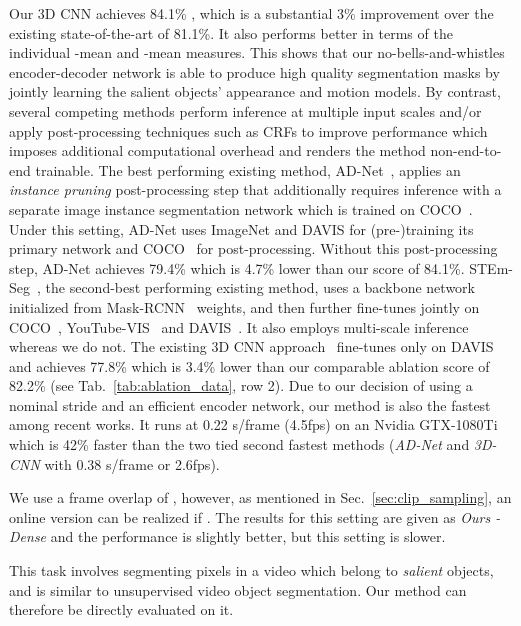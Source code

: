 \documentclass{bmvc2k}
\newcommand{\PAR}[1]{\vskip4pt \noindent {\bf #1~}}
\begin{document}
Our 3D CNN achieves 84.1\% , which is a substantial 3\% improvement over the existing state-of-the-art of 81.1\%. It also performs better in terms of the individual -mean and -mean measures.
This shows that our no-bells-and-whistles encoder-decoder network is able to produce high quality segmentation masks by jointly learning the salient objects' appearance and motion models. 
By contrast, several competing methods perform inference at multiple input scales and/or apply post-processing techniques such as CRFs to improve performance which imposes additional computational overhead and renders the method non-end-to-end trainable. 
The best performing existing method, AD-Net~\cite{Yang19ICCVAnchorDiff}, applies an \textit{instance pruning} post-processing step that additionally requires inference with a separate image instance segmentation network which is trained on COCO~\cite{Lin14ECCV}. Under this setting, AD-Net uses ImageNet and DAVIS for (pre-)training its primary network and COCO~\cite{Lin14ECCV} for post-processing. Without this post-processing step, AD-Net achieves 79.4\%  which is 4.7\% lower than our score of 84.1\%. STEm-Seg~\cite{athar20arxiv}, the second-best performing existing method, uses a backbone network initialized from Mask-RCNN~\cite{He17ICCV} weights, and then further fine-tunes jointly on COCO~\cite{Lin14ECCV}, YouTube-VIS~\cite{Yang19ICCV} and DAVIS~\cite{Perazzi16CVPR}. It also employs multi-scale inference whereas we do not.
The existing 3D CNN approach~\cite{Hou19BMVC} fine-tunes only on DAVIS and achieves 77.8\%  which is 3.4\% lower than our comparable ablation score of 82.2\% (see Tab.~\ref{tab:ablation_data}, row 2).
Due to our decision of using a nominal stride and an efficient encoder network, our method is also the fastest among recent works. It runs at 0.22 s/frame (4.5fps) on an Nvidia GTX-1080Ti which is 42\% faster than the two tied second fastest methods (\textit{AD-Net} and \textit{3D-CNN} with 0.38 s/frame or 2.6fps).


We use a frame overlap of , however, as mentioned in Sec.~\ref{sec:clip_sampling}, an online version can be realized if . The results for this setting are given as \textit{Ours - Dense} and the performance is slightly better, but this setting is slower.  



\PAR{Video Object Saliency:} This task involves segmenting pixels in a video which belong to \textit{salient} objects, and is similar to unsupervised video object segmentation. Our method can therefore be directly evaluated on it. 
\end{document}
